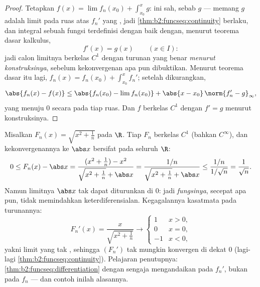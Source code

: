 \begin{proof}
Tetapkan $f(x) = \lim f_n(x_0) + \int_{x_0}^x g$: ini sah, sebab $g$
 --- memang $g$ adalah limit \emph{} pada ruas atas $f_n'$
yang , jadi \cref{thm:b2:funcseq:continuity} berlaku, dan
integral sebuah fungsi  terdefinisi dengan baik dengan, menurut
teorema dasar kalkulus,
\[
f'(x) = g(x) \qquad (x \in I) :
\]
jadi calon limitnya berkelas $C^1$ dengan turunan yang benar
\emph{menurut konstruksinya}, sebelum kekonvergenan apa pun dibuktikan.
Menurut teorema dasar itu lagi, $f_n(x) = f_n(x_0) + \int_{x_0}^x
f_n'$; setelah dikurangkan,
\[
\abs{f_n(x) - f(x)} \leq \abs{f_n(x_0) - \lim f_n(x_0)}
+ \abs{x - x_0}\,\norm{f_n' - g}_{\infty} ,
\]
yang menuju $0$ secara  pada tiap ruas. Dan $f$ berkelas $C^1$
dengan $f' = g$ menurut konstruksinya.
\end{proof}

\begin{example}\label{ex:b2:funcseq:sqrtabs}
Misalkan $F_n(x) = \sqrt{x^2 + \frac1n}$ pada $\R$. Tiap $F_n$ berkelas
$C^1$ (bahkan $C^\infty$), dan kekonvergenannya ke $\abs x$ bersifat
 pada seluruh $\R$:
\[
0 \leq F_n(x) - \abs x
= \frac{(x^2 + \frac1n) - x^2}{\sqrt{x^2+\frac1n} + \abs x}
= \frac{1/n}{\sqrt{x^2 + \frac1n} + \abs x}
\leq \frac{1/n}{1/\sqrt n} = \frac{1}{\sqrt n} .
\]
Namun limitnya $\abs x$ tak dapat diturunkan di $0$: jadi  \emph{fungsinya}, secepat apa pun, tidak memindahkan
keterdiferensialan. Kegagalannya kasatmata pada turunannya:
\[
F_n'(x) = \frac{x}{\sqrt{x^2 + \frac1n}}
\longrightarrow \begin{cases} 1 & x > 0,\\ 0 & x = 0,\\
-1 & x < 0, \end{cases}
\]
yakni limit  yang tak , sehingga $(F_n')$ tak
mungkin konvergen  di dekat $0$ (lagi-lagi
\cref{thm:b2:funcseq:continuity}). Pelajaran penutupnya:
\cref{thm:b2:funcseq:differentiation} dengan sengaja mengandaikan
 pada $f_n'$, bukan pada $f_n$ ---
dan contoh inilah alasannya.
\end{example}

